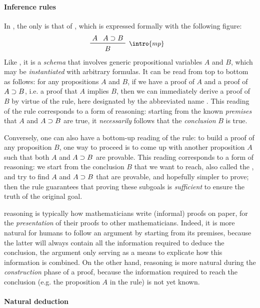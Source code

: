 \paragraph{Inference rules}

In , the only  is that of , which is expressed formally with the following figure:
$$\R[\intro{mp}]{A}{A \limp B}{B}$$
Like , it is a \emph{schema} that involves generic propositional variables
$A$ and $B$, which may be \emph{instantiated} with arbitrary formulas. It can be
read from top to bottom as follows: for any propositions $A$ and $B$, if we have
a proof of $A$ and a proof of $A \supset B$, i.e. a proof that $A$ implies $B$,
then we can immediately derive a proof of $B$ by virtue of the rule, here
designated by the abbreviated name . This reading of the rule
corresponds to a form of  reasoning: starting from the known
\emph{premises} that $A$ and $A \supset B$ are true, it \emph{necessarily} follows
that the \emph{conclusion} $B$ is true.

Conversely, one can also have a bottom-up reading of the rule: to build a proof
of any proposition $B$, one way to proceed is to come up with another
proposition $A$ such that both $A$ and $A \supset B$ are provable. This reading
corresponds to a form of  reasoning: we start from the conclusion
$B$ that we want to reach, also called the , and try to find
 $A$ and $A \supset B$ that are provable, and hopefully simpler to
prove; then the rule guarantees that proving these subgoals is \emph{sufficient}
to ensure the truth of the original goal.

 reasoning is typically how mathematicians write (informal) proofs on
paper, for the \emph{presentation} of their proofs to other mathematicians.
Indeed, it is more natural for humans to follow an argument by starting from its
premises, because the latter will always contain all the information required to
deduce the conclusion, the argument only serving as a means to explicate how
this information is combined. On the other hand,  reasoning is more
natural during the \emph{construction} phase of a proof, because the information
required to reach the conclusion (e.g. the proposition $A$ in the  rule)
is not yet known.

\paragraph{Natural deduction}


